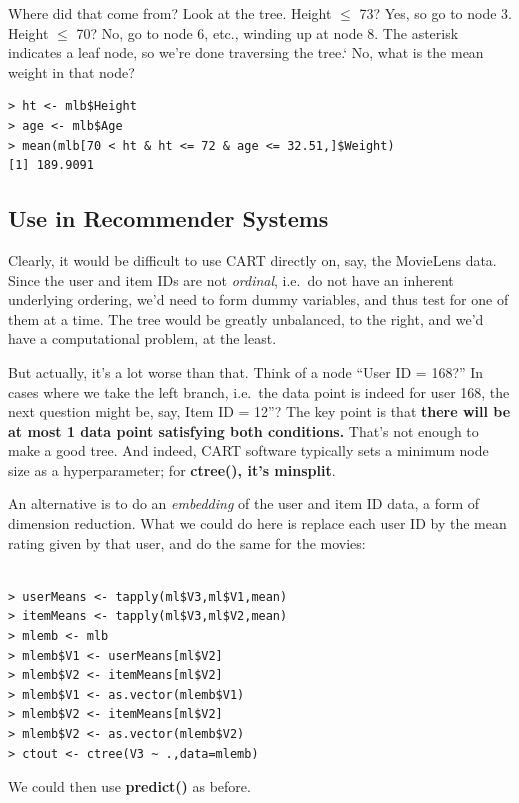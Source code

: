 Where did that come from?  Look at the tree.  Height $\leq$ 73?  Yes, so
go to node 3.  Height $\leq$ 70?  No, go to node 6, etc., winding up at
node 8.  The asterisk indicates a leaf node, so we're done traversing
the tree.` No, what is the mean weight in that node?

\begin{lstlisting}
> ht <- mlb$Height
> age <- mlb$Age
> mean(mlb[70 < ht & ht <= 72 & age <= 32.51,]$Weight)
[1] 189.9091
\end{lstlisting}

\subsection{Use in Recommender Systems}

Clearly, it would be difficult to use CART directly on, say, the
MovieLens data.  Since the user and item IDs are not \textit{ordinal},
i.e.\ do not have an inherent underlying ordering, we'd need to form
dummy variables, and thus test for one of them at a time.  The tree
would be greatly unbalanced, to the right, and we'd have a computational
problem, at the least.

But actually, it's a lot worse than that.  Think of a node ``User ID =
168?''  In cases where we take the left branch, i.e.\ the data point is
indeed for user 168, the next question might be, say, Item ID = 12''?
The key point is that \textbf{there will be at most 1 data point
satisfying both conditions.}   That's not enough to make a good tree.
And indeed, CART software typically sets a minimum node size as a
hyperparameter; for \textbf{ctree(), it's \textbf{minsplit}}.

An alternative is to do an \textit{embedding} of the user and item ID
data, a form of dimension reduction.  What we could do here is replace
each user ID by the mean rating given by that user, and do the same for
the movies:

\begin{lstlisting}

> userMeans <- tapply(ml$V3,ml$V1,mean) 
> itemMeans <- tapply(ml$V3,ml$V2,mean) 
> mlemb <- mlb
> mlemb$V1 <- userMeans[ml$V2]
> mlemb$V2 <- itemMeans[ml$V2]
> mlemb$V1 <- as.vector(mlemb$V1)
> mlemb$V2 <- itemMeans[ml$V2]
> mlemb$V2 <- as.vector(mlemb$V2)
> ctout <- ctree(V3 ~ .,data=mlemb)

\end{lstlisting}

We could then use \textbf{predict()} as before.

